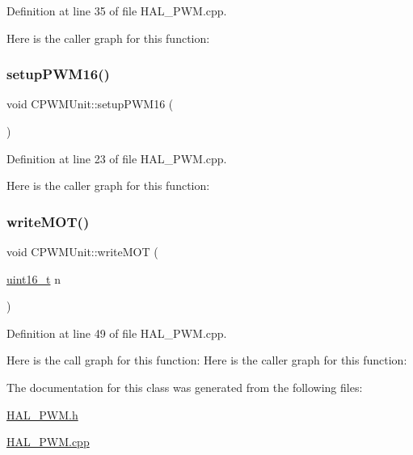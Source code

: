 Definition at line 35 of file H\+A\+L\+\_\+\+P\+W\+M.\+cpp.

Here is the caller graph for this function\+:
\mbox{\label{class_c_p_w_m_unit_a706f0f6235cbd5e71f8bada09cfcea74}} 
\subsubsection{\texorpdfstring{setupPWM16()}{setupPWM16()}}
{\footnotesize\ttfamily void C\+P\+W\+M\+Unit\+::setup\+P\+W\+M16 (\begin{DoxyParamCaption}{ }\end{DoxyParamCaption})}



Definition at line 23 of file H\+A\+L\+\_\+\+P\+W\+M.\+cpp.

Here is the caller graph for this function\+:
\mbox{\label{class_c_p_w_m_unit_a71e701a722052129016d8efddbb34d76}} 
\subsubsection{\texorpdfstring{writeMOT()}{writeMOT()}}
{\footnotesize\ttfamily void C\+P\+W\+M\+Unit\+::write\+M\+OT (\begin{DoxyParamCaption}\item[{\mbox{\hyperlink{_a_d_a_s___types_8h_a1f1825b69244eb3ad2c7165ddc99c956}{uint16\+\_\+t}}}]{n }\end{DoxyParamCaption})}



Definition at line 49 of file H\+A\+L\+\_\+\+P\+W\+M.\+cpp.

Here is the call graph for this function\+:
Here is the caller graph for this function\+:


The documentation for this class was generated from the following files\+:\begin{DoxyCompactItemize}
\item 
\mbox{\hyperlink{_h_a_l___p_w_m_8h}{H\+A\+L\+\_\+\+P\+W\+M.\+h}}\item 
\mbox{\hyperlink{_h_a_l___p_w_m_8cpp}{H\+A\+L\+\_\+\+P\+W\+M.\+cpp}}\end{DoxyCompactItemize}
